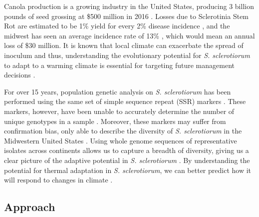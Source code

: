 \documentclass[12pt,letterpaper]{article}
\begin{document}
Canola production is a growing industry in the United States, producing 3 billion pounds of seed grossing at \$500 million in 2016 \citep{usda2017production, usda2017values}. Losses due to Sclerotinia Stem Rot are estimated to be 1\% yield for every 2\% disease incidence \citep{delrio2007impact}, and the midwest has seen an average incidence rate of 13\% \citep{markell2009sclerotinia}, which would mean an annual loss of \$30 million. 
It is known that local climate can exacerbate the spread of inoculum and thus, understanding the evolutionary potential for \textit{S. sclerotiorum} to adapt to a warming climate is essential for targeting future management decisions \citep{attanayake2014inferring,shea2000integrated,billiard2012sex}.

For over 15 years, population genetic analysis on \textit{S. sclerotiorum} has been performed using the same set of simple sequence repeat (SSR) markers \citep{sirjusingh2001characterization}. 
These markers, however, have been unable to accurately determine the number of unique genotypes in a sample \citep{lehner2017independently, lehner2017sclerotinia,arnaud2007standardizing}.
Moreover, these markers may suffer from confirmation bias, only able to describe the diversity of \textit{S. sclerotiorum} in the Midwestern United States \citep{attanayake2013sclerotinia}. 
Using whole genome sequences of representative isolates across continents allows us to capture a breadth of diversity, giving us a clear picture of the adaptive potential in \textit{S. sclerotiorum} \citep{grunwald2016population}.
By understanding the potential for thermal adaptation in \textit{S. sclerotiorum}, we can better predict how it will respond to changes in climate \citep{croll2016genetic}.




\subsection{Approach}



 
\end{document}
